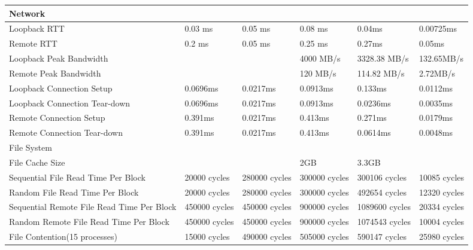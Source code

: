 \small
\begin{center}
\begin{tabular}{| p{4cm} | p{2cm} | p{2cm} | p{2cm} | p{2.5cm} | p{2cm}} 

\hline 
Network & & & & & \\
\hline
Loopback RTT & 0.03 ms & 0.05 ms& 0.08 ms & 0.04ms & 0.00725ms \\
Remote RTT & 0.2 ms& 0.05 ms & 0.25 ms & 0.27ms & 0.05ms\\
Loopback Peak Bandwidth & & & 4000 MB/s & 3328.38 MB/s & 132.65MB/s\\
Remote Peak Bandwidth & & &  120 MB/s  & 114.82 MB/s & 2.72MB/s\\
Loopback Connection Setup & 0.0696ms & 0.0217ms & 0.0913ms & 0.133ms & 0.0112ms \\
Loopback Connection Tear-down & 0.0696ms & 0.0217ms & 0.0913ms & 0.0236ms & 0.0035ms \\
Remote Connection Setup & 0.391ms & 0.0217ms & 0.413ms & 0.271ms & 0.0179ms \\
Remote Connection Tear-down & 0.391ms & 0.0217ms & 0.413ms & 0.0614ms & 0.0048ms \\

\hline 
File System& & & & \\
\hline
File Cache Size & & & 2GB & 3.3GB \\ 
Sequential File Read Time Per Block& 20000 cycles & 280000 cycles& 300000 cycles& 300106 cycles & 10085 cycles\\
Random File Read Time Per Block& 20000 cycles& 280000 cycles& 300000 cycles& 492654 cycles & 12320 cycles \\
Sequential Remote File Read Time Per Block& 450000 cycles& 450000 cycles& 900000 cycles& 1089600 cycles & 20334 cycles\\
Random Remote File Read Time Per Block& 450000 cycles& 450000 cycles& 900000 cycles& 1074543 cycles & 10004 cycles\\
File Contention(15 processes) & 15000 cycles& 490000 cycles& 505000 cycles& 590147 cycles & 25980 cycles \\

\end{tabular}
\end{center}